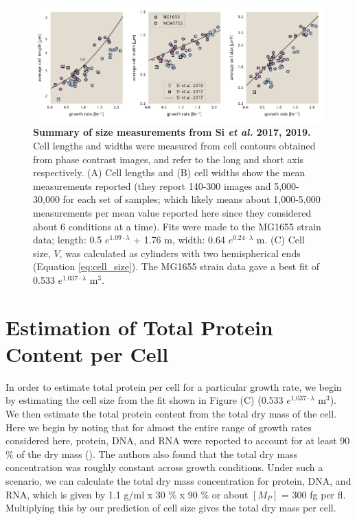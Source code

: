 \begin{figure}
		\centering
    \includegraphics[width=1.0\textwidth]{SI_figs/Si_size_data_fit.pdf}
    \caption{\textbf{Summary of size measurements from Si \textit{et al.} 2017,
    2019.} Cell lengths and widths were measured from cell contours obtained from
    phase contrast images, and refer to the long and short axis respectively. (A)
    Cell lengths and (B) cell widths show the mean measurements reported (they
    report 140-300 images and 5,000-30,000 for each set of samples; which likely
    means about 1,000-5,000 measurements per mean value reported here since they
    considered about 6 conditions at a time). Fits were made to the  MG1655 strain
    data; length: 0.5 $e^{1.09 \cdot \lambda}$ + 1.76 \textmu m, width:  0.64
    $e^{0.24 \cdot \lambda}$ \textmu m. (C) Cell size, $V$, was calculated as
    cylinders with two hemispherical ends (Equation \ref{eq:cell_size}). The
    MG1655 strain data gave a best fit of 0.533 $e^{1.037 \cdot \lambda}$ \textmu m$^3$.}
  \label{fig:final_size_data_Si}
\end{figure}


\section{Estimation of Total Protein Content per Cell}
\label{sec:estimate_protein_per_cell}
In order to estimate total protein per cell for a particular growth rate, we begin
by estimating the cell size from the fit shown in Figure (C) (0.533
$e^{1.037 \cdot \lambda}$ \textmu m$^3$). We then estimate the total protein content
from the total dry mass of the cell.
Here we begin by noting
that  for almost the entire range of growth rates considered here,
protein, DNA, and RNA were reported to account for at least 90 \% of the dry mass (\cite{basan2015}). The
authors also found that
the total dry mass concentration was roughly constant across growth conditions.
Under such a scenario, we can calculate the total dry mass concentration for
protein, DNA, and RNA, which is given by 1.1 g/ml x 30 \% x 90 \% or about
$[M_P]$ = 300 fg per fl. Multiplying this by our prediction of cell size gives the total dry mass
 per cell.

